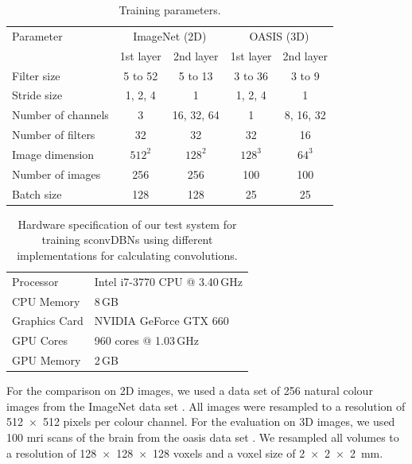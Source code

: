 \begin{table}
\centering
\caption{Training parameters.}
\begin{tabular}{lcccc}
\toprule
Parameter & \multicolumn{2}{c}{ImageNet (2D)} & \multicolumn{2}{c}{OASIS (3D)}
\\
\addlinespace
 & \multicolumn{1}{c}{1st layer} & \multicolumn{1}{c}{2nd layer} 
 & \multicolumn{1}{c}{1st layer} & \multicolumn{1}{c}{2nd layer} \\
\midrule
Filter size & 5 to 52 & 5 to 13 & 3 to 36 & 3 to 9 \\
Stride size & 1, 2, 4 & 1 & 1, 2, 4 & 1 \\
Number of channels & 3 & 16, 32, 64 & 1 & 8, 16, 32 \\
Number of filters & 32 & 32 & 32 & 16 \\
Image dimension & $512^2$ & $128^2$ & $128^3$ & $64^3$ \\
Number of images & 256 & 256 & 100 & 100 \\
Batch size & 128 & 128 & 25 & 25 \\
\bottomrule
\end{tabular}
\label{tab:parameters}
\end{table}

\begin{table} 
\centering
\caption{Hardware specification of our test system for training sconvDBNs using
different implementations for calculating convolutions.}
\label{tab:hardware1}
\begin{tabular} {ll}
\toprule
Processor & Intel i7-3770 CPU @ 3.40\,GHz \\
CPU Memory & 8\,GB \\
\addlinespace
Graphics Card & NVIDIA GeForce GTX 660 \\
GPU Cores & 960 cores @ 1.03\,GHz \\
GPU Memory & 2\,GB \\
\bottomrule
\end{tabular}
\end{table}

For the comparison on 2D images, we used a data set of 256 natural colour images
from the ImageNet data set \citep{deng2009}. All images were resampled to a
resolution of \num{512x512} pixels per colour channel. For the evaluation on 3D
images, we used 100 \gls{mri} scans of the brain from the \gls{oasis}
data set \citep{marcus2007}. We resampled all volumes to a resolution of
\num{128x128x128} voxels and a voxel size of \SI{2x2x2}{\milli\metre}.

